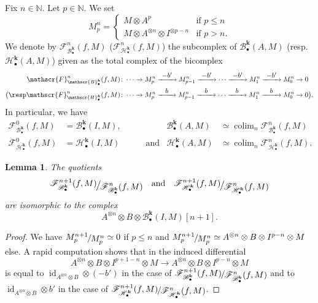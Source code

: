 \documentclass[JEP,XML,SOM,Unicode,NoEqCountersInSection]{cedram}
\let\mathcal\mathscr
\newcommand{\To}[1]{\mathchoice{\xrightarrow{\textstyle\kern4pt#1\kern3pt}}{\stackrel{#1}{\longrightarrow}}{}{}}
\let\ra\rightarrow
\newcommand{\sbullet}{{\scriptscriptstyle\bullet}}
\newtheorem{lem}[thm]{Lemma}
\theoremstyle{definition}
\newcommand{\N}{\mathbb{N}}
\newcommand{\Bc}{\mathcal{B}}
\newcommand{\Hc}{\mathcal{H}}
\newcommand{\Fc}{\mathcal{F}}
\DeclareMathOperator{\id}{id}
\DeclareMathOperator{\colim}{colim}
\newcommand{\quot}[2]{\ensuremath \mathchoice {\displaystyle #1 \raisebox{-2pt}{$\displaystyle \hspace{-1pt}{\big/} $} \raisebox{-4pt}{$\displaystyle \hspace{-1pt}{#2}$}}{\textstyle #1 \raisebox{-1pt}{$\textstyle \hspace{-1pt}{/} $} \raisebox{-2pt}{$\textstyle \hspace{-1pt}{#2}$}}{\scriptstyle #1 \raisebox{-1pt}{$\scriptstyle \hspace{-1pt}{/} $} \raisebox{-2pt}{$\scriptstyle \hspace{-1pt}{#2}$}}{\scriptscriptstyle #1 \raisebox{-1pt}{$\scriptscriptstyle \hspace{-1pt}{/} $} \raisebox{-2pt}{$\scriptscriptstyle \hspace{-1pt}{#2}$}}}
\renewcommand{\k}{{\boldsymbol{k}}}
\begin{document}
Fix $n \in \N$. Let $p \in \N$. We set
\[
M^n_p = \begin{cases}
M \otimes A^p & \text{if } p \leq n \\
M \otimes A^{\otimes n} \otimes I^{\otimes p-n} & \text{if } p > n.
\end{cases}
\]
We denote by $\Fc_{\Bc_\sbullet^\k}^n(f,M)$ (\resp $\Fc_{\Hc_\sbullet^\k}^n(f,M)$) the subcomplex of $\Bc_\sbullet^\k(A,M)$ (resp.\ $\Hc_\sbullet^\k(A,M)$) given as the total complex of the bicomplex
\begin{align*}
\Fc_{\Bc_\sbullet^\k}^n(f,M) \colon& \cdots \ra M^n_p \To{-b'} M^n_{p-1} \To{-b'} \cdots \To{-b'} M^n_1 \To{-b'} M^n_0 \ra 0 \\
\bigl(\resp \Fc_{\Hc_\sbullet^\k}^n(f,M) \colon& \cdots \ra M^n_p \To{\hspace*{1.7mm}b\hspace*{1.7mm}} M^n_{p-1} \To{\hspace*{1.9mm}b\hspace*{1.9mm}} \cdots \To{\hspace*{1.8mm}b\hspace*{1.9mm}} M^n_1 \To{\hspace*{2mm}b\hspace*{2mm}} M^n_0 \ra 0  \bigr).
\end{align*}
In particular, we have
\begin{align*}
\Fc_{\Bc_\sbullet^\k}^0(f,M) &= \Bc_\sbullet^\k(I,M) \text{, }& \Bc_\sbullet^\k(A,M) &\simeq \colim_n \Fc_{\Bc_\sbullet^\k}^n(f,M) \\
\Fc_{\Hc_\sbullet^\k}^0(f,M) &= \Hc_\sbullet^\k(I,M)\qquad\quad\text{and}& \Hc_\sbullet^\k(A,M) &\simeq \colim_n \Fc_{\Hc_\sbullet^\k}^n(f,M).
\end{align*}
\begin{lem}\label{lem:filtrationF}
The quotients
\[
\quot{\Fc_{\Bc_\sbullet^\k}^{n+1}(f,M)}{\Fc_{\Bc_\sbullet^\k}^n(f,M)}\quad\text{and}\quad\quot{\Fc_{\Hc_\sbullet^\k}^{n+1}(f,M)}{\Fc_{\Hc_\sbullet^\k}^n(f,M)}
\]
are isomorphic to the complex
\[
A^{\otimes n} \otimes B \otimes \Bc_\sbullet^\k(I,M)[n+1].
\]
\end{lem}
\begin{proof}
We have $\quot{M^{n+1}_p}{M^n_p} \simeq 0$ if $p \leq n$ and $\quot{M^{n+1}_p}{M^n_p} \simeq A^{\otimes n} \otimes B \otimes I^{p-n} \otimes M$ else.
A rapid computation shows that in the induced differential
\[
A^{\otimes n} \otimes B \otimes I^{p+1-n} \otimes M \to A^{\otimes n} \otimes B \otimes I^{p-n} \otimes M
\]
is equal to $\id_{A^{\otimes n} \otimes B} \otimes (-b')$ in the case of $\quot{\Fc_{\Bc_\sbullet^\k}^{n+1}(f,M)}{\Fc_{\Bc_\sbullet^\k}^n(f,M)}$ and to $\id_{A^{\otimes n} \otimes B} \otimes b'$ in the case of $\quot{\Fc_{\Hc_\sbullet^\k}^{n+1}(f,M)}{\Fc_{\Hc_\sbullet^\k}^n(f,M)}$.
\end{proof}
\end{document}
